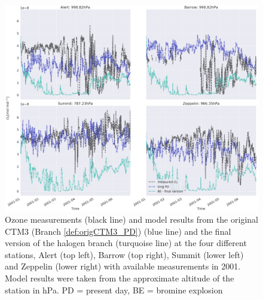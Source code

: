 \begin{figure}[h]
    \centering
    \includegraphics[width = \linewidth]{Chapter6_Results/images/ozone_2001_step5.png}
    \caption{Ozone measurements (black line) and model results from the original CTM3 (Branch \ref{def:origCTM3_PD}) (blue line) and the final version of the halogen branch (turquoise line) at the four different stations, Alert (top left), Barrow (top right), Summit (lower left) and Zeppelin (lower right) with available measurements in 2001. Model results were taken from the approximate altitude of the station in hPa. PD = present day, BE = bromine explosion}
    \label{fig:step5}
\end{figure}